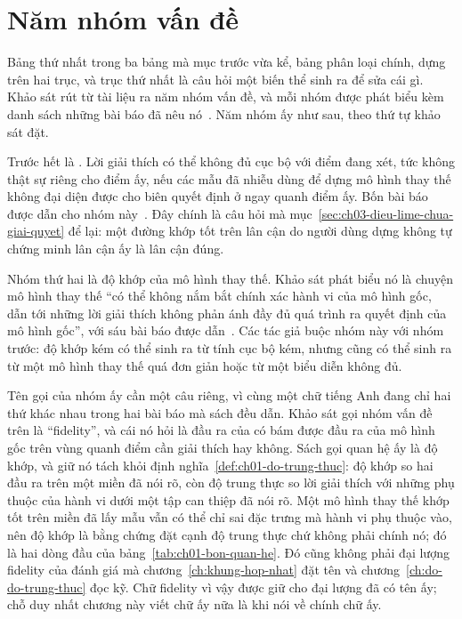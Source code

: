 \section{Năm nhóm vấn đề}
\label{sec:ch10-nam-nhom-van-de}

%
Bảng thứ nhất trong ba bảng mà mục trước vừa kể, bảng phân loại chính, dựng
trên hai trục, và trục thứ nhất là câu hỏi một biến thể sinh ra để sửa cái gì. Khảo sát rút từ tài liệu ra năm nhóm vấn đề, và
mỗi nhóm được phát biểu kèm danh sách những bài báo đã nêu
nó~\autocite{p22whichlime}. Năm nhóm ấy như sau, theo thứ tự khảo sát đặt.

%
Trước hết là . Lời giải thích có thể không đủ cục bộ
với điểm đang xét, tức không thật sự riêng cho điểm ấy, nếu các mẫu đã nhiễu dùng để dựng mô hình thay thế không đại
diện được cho biên quyết định ở ngay quanh điểm ấy. Bốn bài báo được dẫn cho
nhóm này~\autocite{p22whichlime}. Đây chính là câu hỏi mà mục~\ref{sec:ch03-dieu-lime-chua-giai-quyet}
để lại: một đường khớp tốt trên lân cận do người dùng dựng không tự chứng minh
lân cận ấy là lân cận đúng.

Nhóm thứ hai là độ khớp của mô hình thay thế. Khảo sát phát biểu nó là chuyện mô
hình thay thế \enquote{có thể không nắm bắt chính xác hành vi của mô hình gốc,
dẫn tới những lời giải thích không phản ánh đầy đủ quá trình ra quyết định của
mô hình gốc}, với sáu bài báo được dẫn~\autocite{p22whichlime}. Các tác giả
buộc nhóm này với nhóm trước:
độ khớp kém có thể sinh ra từ tính cục bộ kém, nhưng cũng có thể sinh ra từ một
mô hình thay thế quá đơn giản hoặc từ một biểu diễn
 không đủ.

Tên gọi của nhóm ấy cần một câu riêng, vì cùng một chữ tiếng Anh đang chỉ hai
thứ khác nhau trong hai bài báo mà sách đều dẫn. Khảo sát gọi nhóm vấn đề trên là
\enquote{fidelity}, và cái nó hỏi là đầu ra của
 có bám được đầu ra của mô hình gốc
trên vùng quanh điểm cần giải thích hay không. Sách gọi quan hệ ấy là độ khớp,
và giữ nó tách khỏi định nghĩa~\ref{def:ch01-do-trung-thuc}: độ khớp so hai đầu
ra trên một miền đã nói rõ, còn độ trung thực so lời giải thích với những phụ
thuộc của hành vi dưới một tập can thiệp đã nói rõ. Một mô hình thay thế khớp
tốt trên miền đã lấy mẫu vẫn có thể chỉ sai đặc trưng mà hành vi phụ thuộc vào,
nên độ khớp là bằng chứng đặt cạnh độ trung thực chứ không phải chính nó; đó là
hai dòng đầu của bảng~\ref{tab:ch01-bon-quan-he}. Đó
cũng không phải
đại lượng fidelity của
đánh giá  mà chương~\ref{ch:khung-hop-nhat} đặt tên và
chương~\ref{ch:do-do-trung-thuc} đọc kỹ. Chữ fidelity vì vậy được giữ cho đại
lượng đã có tên ấy; chỗ duy nhất chương này viết chữ ấy nữa là khi nói về chính
chữ ấy.

